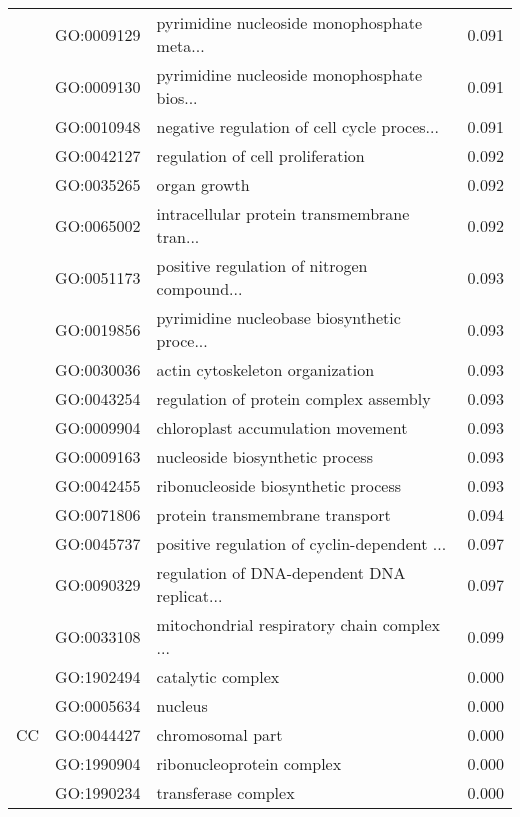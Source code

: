 \begin{longtable}{lllr}
   & GO:0009129 &  pyrimidine nucleoside monophosphate meta... &         0.091 \\
   & GO:0009130 &  pyrimidine nucleoside monophosphate bios... &         0.091 \\
   & GO:0010948 &  negative regulation of cell cycle proces... &         0.091 \\
   & GO:0042127 &             regulation of cell proliferation &         0.092 \\
   & GO:0035265 &                                 organ growth &         0.092 \\
   & GO:0065002 &  intracellular protein transmembrane tran... &         0.092 \\
   & GO:0051173 &  positive regulation of nitrogen compound... &         0.093 \\
   & GO:0019856 &  pyrimidine nucleobase biosynthetic proce... &         0.093 \\
   & GO:0030036 &              actin cytoskeleton organization &         0.093 \\
   & GO:0043254 &       regulation of protein complex assembly &         0.093 \\
   & GO:0009904 &            chloroplast accumulation movement &         0.093 \\
   & GO:0009163 &              nucleoside biosynthetic process &         0.093 \\
   & GO:0042455 &          ribonucleoside biosynthetic process &         0.093 \\
   & GO:0071806 &              protein transmembrane transport &         0.094 \\
   & GO:0045737 &  positive regulation of cyclin-dependent ... &         0.097 \\
   & GO:0090329 &  regulation of DNA-dependent DNA replicat... &         0.097 \\
   & GO:0033108 &  mitochondrial respiratory chain complex ... &         0.099 \\
\cline{1-4}
\multirow{54}{*}{CC} & GO:1902494 &                            catalytic complex &         0.000 \\
   & GO:0005634 &                                      nucleus &         0.000 \\
   & GO:0044427 &                             chromosomal part &         0.000 \\
   & GO:1990904 &                    ribonucleoprotein complex &         0.000 \\
   & GO:1990234 &                          transferase complex &         0.000 \\

\end{longtable}
